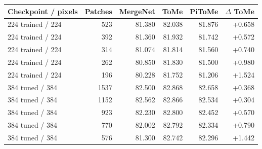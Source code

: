 \begin{tabular}{lrrrrr}
\toprule
Checkpoint / pixels & Patches & MergeNet & ToMe & PiToMe & $\Delta$ ToMe \\
\midrule
224 trained / 224 & 523 & 81.380 & 82.038 & 81.876 & +0.658 \\
224 trained / 224 & 392 & 81.360 & 81.932 & 81.742 & +0.572 \\
224 trained / 224 & 314 & 81.074 & 81.814 & 81.560 & +0.740 \\
224 trained / 224 & 262 & 80.850 & 81.830 & 81.500 & +0.980 \\
224 trained / 224 & 196 & 80.228 & 81.752 & 81.206 & +1.524 \\
384 tuned / 384 & 1537 & 82.500 & 82.868 & 82.658 & +0.368 \\
384 tuned / 384 & 1152 & 82.562 & 82.866 & 82.534 & +0.304 \\
384 tuned / 384 & 923 & 82.230 & 82.800 & 82.452 & +0.570 \\
384 tuned / 384 & 770 & 82.002 & 82.792 & 82.334 & +0.790 \\
384 tuned / 384 & 576 & 81.300 & 82.742 & 82.296 & +1.442 \\
\bottomrule
\end{tabular}
